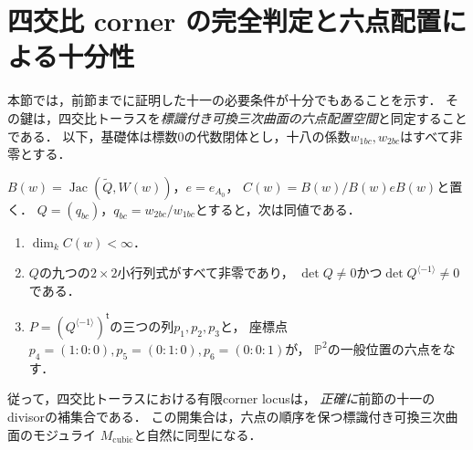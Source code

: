 \section{四交比 corner の完全判定と六点配置による十分性}
\label{sec:six-point-classification}
本節では，前節までに証明した十一の必要条件が十分でもあることを示す．
その鍵は，四交比トーラスを\emph{標識付き可換三次曲面の六点配置空間}と同定することである．
以下，基礎体は標数0の代数閉体とし，十八の係数$w_{1bc},w_{2bc}$はすべて非零とする．

\begin{theorem}[corner有限性の必要十分条件]
\label{thm:general-position-iff}
$B(w)=\operatorname{Jac}(\widetilde Q,W(w))$，$e=e_{A_0}$，
$C(w)=B(w)/B(w)eB(w)$と置く．
$Q=(q_{bc})$，$q_{bc}=w_{2bc}/w_{1bc}$とすると，次は同値である．
\begin{enumerate}
\item $\dim_kC(w)<\infty$．
\item $Q$の九つの$2\times2$小行列式がすべて非零であり，
$\det Q\ne0$かつ$\det Q^{\langle-1\rangle}\ne0$である．
\item $P=(Q^{\langle-1\rangle})^{\mathsf t}$の三つの列$p_1,p_2,p_3$と，
座標点$p_4=(1:0:0),p_5=(0:1:0),p_6=(0:0:1)$が，
$\mathbb P^2$の一般位置の六点をなす．
\end{enumerate}
従って，四交比トーラスにおける有限corner locusは，
\emph{正確に}前節の十一のdivisorの補集合である．
この開集合は，六点の順序を保つ標識付き可換三次曲面のモジュライ
$M_{\mathrm{cubic}}$と自然に同型になる．
\end{theorem}
